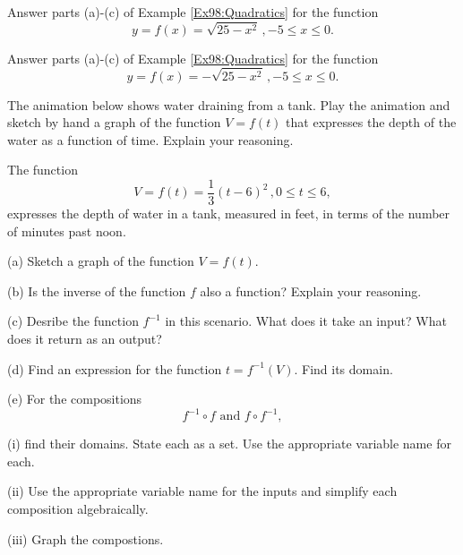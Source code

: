 \documentclass{ximera}
\begin{document}
\begin{example}  \label{Ex97:Quadratics}
Answer parts (a)-(c) of Example \ref{Ex98:Quadratics} for the function
\[
    y=   f(x) = \sqrt{25-x^2} \, , -5 \leq x \leq 0 .
\]

\end{example}

\begin{example}  \label{Ex96:Quadratics}
Answer parts (a)-(c) of Example \ref{Ex98:Quadratics} for the function
\[
    y=   f(x) = - \sqrt{25-x^2} \, , -5 \leq x \leq 0 .
\]

\end{example}



\begin{exploration} \label{E1:Quadratics}
The animation below shows water draining from a tank. Play the animation and sketch by hand a graph of the function $V=f(t)$ that expresses the depth of the water as a function of time. Explain your reasoning.


 
\begin{onlineOnly}
    \begin{center}
\end{center}
\end{onlineOnly}
\end{exploration}


\begin{example} \label{Ex1:Quadratics}
The function 
\[
     V = f(t) = \frac{1}{3}(t-6)^2 \, , 0\leq t \leq 6 ,
\]
expresses the depth of water in a tank, measured in feet, in terms of the number of minutes past noon. 

(a) Sketch a graph of the function $V=f(t)$.

(b) Is the inverse of the function $f$ also a function? Explain your reasoning.

(c) Desribe the function $f^{-1}$ in this scenario. What does it take an input? What does it return as an output?

(d) Find an expression for the function $t = f^{-1}(V)$. Find its domain.

(e) For the compositions
\[
    f^{-1}\circ f \text{  and  } f\circ f^{-1} ,
\]

(i) find their domains. State each as a set. Use the appropriate variable name for each.

(ii) Use the appropriate variable name for the inputs and simplify each composition algebraically.

(iii) Graph the compostions.


\end{example}
\end{document}
